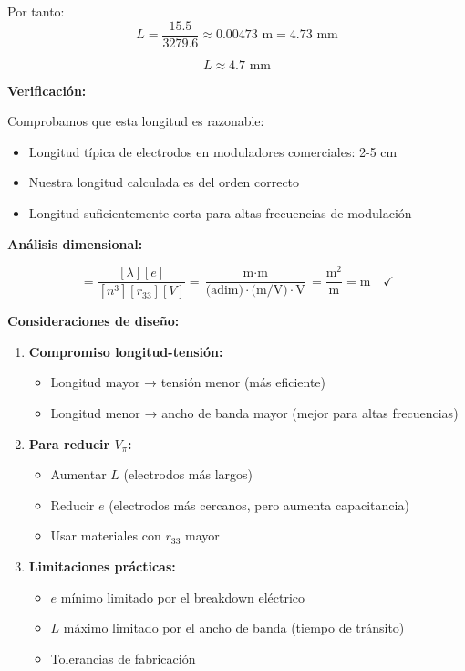 \documentclass[12pt,a4paper]{article}
\begin{document}
\begin{enumerate}
Por tanto:
\begin{equation}
    L = \frac{15.5}{3279.6} \approx 0.00473 \text{ m} = 4.73 \text{ mm}
\end{equation}

\begin{equation}
    \boxed{L \approx 4.7 \text{ mm}}
\end{equation}

\textbf{Verificación:}

Comprobamos que esta longitud es razonable:
\begin{itemize}
    \item Longitud típica de electrodos en moduladores comerciales: 2-5 cm
    \item Nuestra longitud calculada es del orden correcto
    \item Longitud suficientemente corta para altas frecuencias de modulación
\end{itemize}

\textbf{Análisis dimensional:}

\begin{equation}
    [L] = \frac{[\lambda][e]}{[n^3][r_{33}][V]} = \frac{\text{m} \cdot \text{m}}{\text{(adim)} \cdot \text{(m/V)} \cdot \text{V}} = \frac{\text{m}^2}{\text{m}} = \text{m} \quad ✓
\end{equation}

\textbf{Consideraciones de diseño:}

\begin{enumerate}
    \item \textbf{Compromiso longitud-tensión:}
    \begin{itemize}
        \item Longitud mayor → tensión menor (más eficiente)
        \item Longitud menor → ancho de banda mayor (mejor para altas frecuencias)
    \end{itemize}
    
    \item \textbf{Para reducir $V_\pi$:}
    \begin{itemize}
        \item Aumentar $L$ (electrodos más largos)
        \item Reducir $e$ (electrodos más cercanos, pero aumenta capacitancia)
        \item Usar materiales con $r_{33}$ mayor
    \end{itemize}
    
    \item \textbf{Limitaciones prácticas:}
    \begin{itemize}
        \item $e$ mínimo limitado por el breakdown eléctrico
        \item $L$ máximo limitado por el ancho de banda (tiempo de tránsito)
        \item Tolerancias de fabricación
    \end{itemize}
\end{enumerate}


\end{enumerate}
\end{document}
